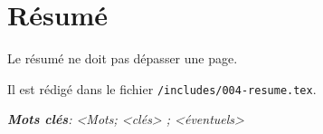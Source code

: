 \newpage

\section*{Résumé}
  
Le résumé ne doit pas dépasser une page.

Il est rédigé dans le fichier \texttt{/includes/004-resume.tex}.

\bigskip

\textbf{\emph{Mots clés}}\emph{: <Mots; <clés> 
; <éventuels>}
